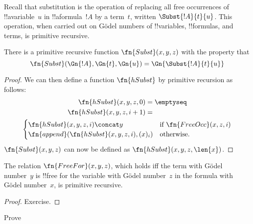 \documentclass[../../../include/open-logic-section]{subfiles}
\begin{document}

Recall that substitution is the operation of replacing all free
occurrences of !!a{variable}~$u$ in !!a{formula}~$!A$ by a term~$t$,
written $\Subst{!A}{t}{u}$. This operation, when carried out on
G\"odel numbers of !!{variable}s, !!{formula}s, and terms, is
primitive recursive.

\begin{prop}
There is a primitive recursive function $\fn{Subst}(x, y, z)$ with the
property that
\[
\fn{Subst}(\Gn{!A}, \Gn{t}, \Gn{u}) = \Gn{\Subst{!A}{t}{u}}
\]
\end{prop}

\begin{proof}
We can then define a function $\fn{hSubst}$ by primitive recursion as
follows:
\begin{multline*}
\begin{aligned}
\fn{hSubst}(x, y, z, 0) & = \emptyseq \\
\fn{hSubst}(x, y, z, i+1) & =
\end{aligned}\\
\begin{cases}
\fn{hSubst}(x, y, z, i) \concat y & \text{if $\fn{FreeOcc}(x, z, i)$} \\
\fn{append}(\fn{hSubst}(x, y, z, i), (x)_{i}) & \text{otherwise.}
\end{cases}
\end{multline*}
$\fn{Subst}(x, y, z)$ can now be defined as $\fn{hSubst}(x, y, z, \len{x})$.
\end{proof}

\begin{prop}
The relation $\fn{FreeFor}(x, y, z)$, which holds iff the term with
G\"odel number~$y$ is !!{free for} the variable with G\"odel
number~$z$ in the formula with G\"odel number~$x$, is primitive
recursive.
\end{prop}

\begin{proof} Exercise. \end{proof}

\begin{prob}
Prove 
\end{prob}
\end{document}

